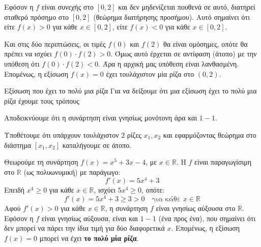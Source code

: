 Εφόσον η $f$ είναι συνεχής στο $[0, 2]$ και δεν μηδενίζεται πουθενά σε αυτό, διατηρεί σταθερό πρόσημο στο $[0, 2]$ (θεώρημα διατήρησης προσήμου). 
Αυτό σημαίνει ότι είτε $f(x) > 0$ για κάθε $x \in [0, 2]$, είτε $f(x) < 0$ για κάθε $x \in [0, 2]$.

Και στις δύο περιπτώσεις, οι τιμές $f(0)$ και $f(2)$ θα είναι ομόσημες, οπότε θα πρέπει να ισχύει $f(0) \cdot f(2) > 0$.
Όμως αυτό έρχεται σε αντίφαση (άτοπο) με την υπόθεση ότι $f(0) \cdot f(2) < 0$. 
Άρα η αρχική μας υπόθεση είναι λανθασμένη. Επομένως, η εξίσωση $f(x) = 0$ έχει τουλάχιστον μία ρίζα στο $(0, 2)$.\\

\begin{askhsh}{Εξίσωση που έχει το πολύ μια ρίζα}
Για να δείξουμε ότι μια εξίσωση έχει το πολύ μια ρίζα έχουμε τους τρόπους
\\\tropoi\begin{tropos}
\item Αποδεικνύουμε ότι η συνάρτηση είναι γνησίως μονότονη άρα και $ 1-1 $.
\item Υποθέτουμε ότι υπάρχουν τουλάχιστον $ 2 $ ρίζες $ x_1,x_2 $ και εφαρμόζοντας θεώρημα  στο διάστημα $ [x_1,x_2] $ καταλήγουμε σε άτοπο.
\end{tropos}
\end{askhsh}


\lysh
Θεωρούμε τη συνάρτηση $f(x) = x^5 + 3x - 4$, με $x \in \mathbb{R}$.
Η $f$ είναι παραγωγίσιμη στο $\mathbb{R}$ (ως πολυωνυμική) με παράγωγο:
\[ f'(x) = 5x^4 + 3 \]
Επειδή $x^4 \ge 0$ για κάθε $x \in \mathbb{R}$, ισχύει $5x^4 \ge 0$, οπότε:
\[ f'(x) = 5x^4 + 3 \ge 3 > 0 \quad \text{για κάθε } x \in \mathbb{R} \]
Αφού $f'(x) > 0$ για κάθε $x \in \mathbb{R}$, η συνάρτηση $f$ είναι γνησίως αύξουσα στο $\mathbb{R}$.
Εφόσον η $f$ είναι γνησίως αύξουσα, είναι και $1-1$ (ένα προς ένα), που σημαίνει ότι δεν μπορεί να πάρει την ίδια τιμή για δύο διαφορετικά $x$.
Επομένως, η εξίσωση $f(x) = 0$ μπορεί να έχει \textbf{το πολύ μία ρίζα}.\\


